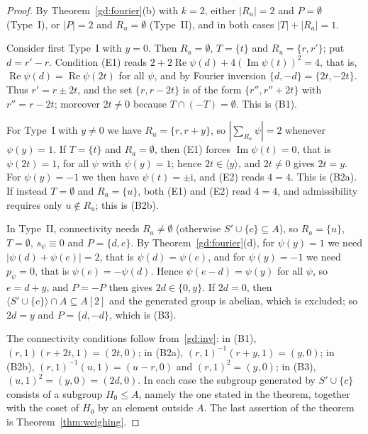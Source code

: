 \documentclass[preprint,11pt]{elsarticle}
\theoremstyle{definition}
\theoremstyle{remark}
\newcommand{\ii}{\mathrm i}
\begin{document}
\begin{proof}
By Theorem~\ref{gd:fourier}(b) with $k=2$, either $|R_u|=2$ and $P=\emptyset$ (Type~I), or $|P|=2$ and $R_u=\emptyset$ (Type~II), and in both cases $|T|+|R_a|=1$.

Consider first Type~I with $y=0$. Then $R_a=\emptyset$, $T=\{t\}$ and $R_u=\{r,r'\}$; put $d=r'-r$. Condition (E1) reads $2+2\operatorname{Re}\psi(d)+4(\operatorname{Im}\psi(t))^2=4$, that is, $\operatorname{Re}\psi(d)=\operatorname{Re}\psi(2t)$ for all $\psi$, and by Fourier inversion $\{d,-d\}=\{2t,-2t\}$. Thus $r'=r\pm2t$, and the set $\{r,r-2t\}$ is of the form $\{r'',r''+2t\}$ with $r''=r-2t$; moreover $2t\ne0$ because $T\cap(-T)=\emptyset$. This is (B1).

For Type~I with $y\ne0$ we have $R_u=\{r,r+y\}$, so $|\sum_{R_u}\psi|=2$ whenever $\psi(y)=1$. If $T=\{t\}$ and $R_a=\emptyset$, then (E1) forces $\operatorname{Im}\psi(t)=0$, that is $\psi(2t)=1$, for all $\psi$ with $\psi(y)=1$; hence $2t\in\langle y\rangle$, and $2t\ne0$ gives $2t=y$. For $\psi(y)=-1$ we then have $\psi(t)=\pm\ii$, and (E2) reads $4=4$. This is (B2a). If instead $T=\emptyset$ and $R_a=\{u\}$, both (E1) and (E2) read $4=4$, and admissibility requires only $u\notin R_u$; this is (B2b).

In Type~II, connectivity needs $R_a\ne\emptyset$ (otherwise $S'\cup\{c\}\subseteq A$), so $R_a=\{u\}$, $T=\emptyset$, $s_\psi\equiv0$ and $P=\{d,e\}$. By Theorem~\ref{gd:fourier}(d), for $\psi(y)=1$ we need $|\psi(d)+\psi(e)|=2$, that is $\psi(d)=\psi(e)$, and for $\psi(y)=-1$ we need $p_\psi=0$, that is $\psi(e)=-\psi(d)$. Hence $\psi(e-d)=\psi(y)$ for all $\psi$, so $e=d+y$, and $P=-P$ then gives $2d\in\{0,y\}$. If $2d=0$, then $\langle S'\cup\{c\}\rangle\cap A\subseteq A[2]$ and the generated group is abelian, which is excluded; so $2d=y$ and $P=\{d,-d\}$, which is (B3).

The connectivity conditions follow from~\eqref{gd:inv}: in (B1), $(r,1)(r+2t,1)=(2t,0)$; in (B2a), $(r,1)^{-1}(r+y,1)=(y,0)$; in (B2b), $(r,1)^{-1}(u,1)=(u-r,0)$ and $(r,1)^2=(y,0)$; in (B3), $(u,1)^2=(y,0)=(2d,0)$. In each case the subgroup generated by $S'\cup\{c\}$ consists of a subgroup $H_0\le A$, namely the one stated in the theorem, together with the coset of $H_0$ by an element outside $A$. The last assertion of the theorem is Theorem~\ref{thm:weighing}.
\end{proof}
\end{document}
